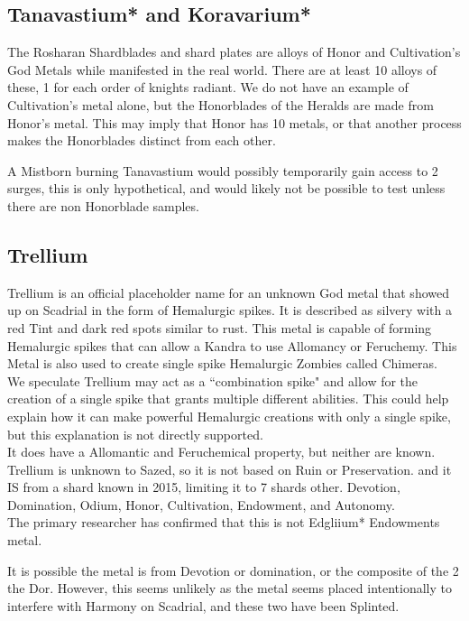 \documentclass[conference]{IEEEtran}
\begin{document}
\subsection*{Tanavastium* and Koravarium*}
The Rosharan Shardblades and shard plates are alloys of Honor and Cultivation's God Metals while manifested in the real world.  There are at least 10 alloys of these, 1 for each order of knights radiant.  We do not have an example of Cultivation's metal alone, but the Honorblades of the Heralds are made from Honor's metal.  This may imply that Honor has 10 metals, or that another process makes the Honorblades distinct from each other.

A Mistborn burning Tanavastium would possibly temporarily gain access to 2 surges, this is only hypothetical, and would likely not be possible to test unless there are non Honorblade samples.

\subsection*{Trellium}
Trellium is an official placeholder name for an unknown God metal that showed up on Scadrial in the form of Hemalurgic spikes.  It is described as silvery with a red Tint and dark red spots similar to rust.  This metal is capable of forming Hemalurgic spikes that can allow a Kandra to use Allomancy or Feruchemy.  This Metal is also used to create single spike Hemalurgic Zombies called Chimeras.\\

We speculate Trellium may act as a ``combination spike" and allow for the creation of a single spike that grants multiple different abilities.  This could help explain how it can make powerful Hemalurgic creations with only a single spike, but this explanation is not directly supported.\\
 
It does have a Allomantic and Feruchemical property, but neither are known.\\

Trellium is unknown to Sazed, so it is not based on Ruin or Preservation. and it IS from a shard known in 2015, limiting it to 7 shards other.  Devotion, Domination, Odium, Honor, Cultivation, Endowment, and Autonomy.\\

The primary researcher has confirmed that this is not Edgliium* Endowments metal. 

It is possible the metal is from Devotion or domination, or the composite of the 2 the Dor.  However, this seems unlikely as the metal seems placed intentionally to interfere with Harmony on Scadrial, and these two have been Splinted.
\end{document}
